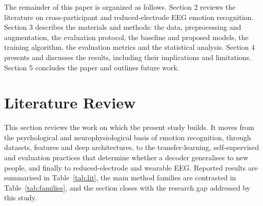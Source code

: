 The remainder of this paper is organized as follows. Section 2 reviews the literature on cross-participant and reduced-electrode EEG emotion recognition. Section 3 describes the materials and methods: the data, preprocessing and augmentation, the evaluation protocol, the baseline and proposed models, the training algorithm, the evaluation metrics and the statistical analysis. Section 4 presents and discusses the results, including their implications and limitations. Section 5 concludes the paper and outlines future work.


\section{Literature Review}
This section reviews the work on which the present study builds. It moves from the psychological and neurophysiological basis of emotion recognition, through datasets, features and deep architectures, to the transfer-learning, self-supervised and evaluation practices that determine whether a decoder generalises to new people, and finally to reduced-electrode and wearable EEG. Reported results are summarised in Table~\ref{tab:lit}, the main method families are contrasted in Table~\ref{tab:families}, and the section closes with the research gap addressed by this study.

